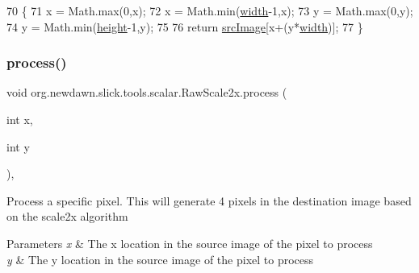 \begin{DoxyCode}
70     \{
71         x = Math.max(0,x);
72         x = Math.min(\mbox{\hyperlink{classorg_1_1newdawn_1_1slick_1_1tools_1_1scalar_1_1_raw_scale2x_ac44a63899fa4a47dacffcf3c3fbc5526}{width}}-1,x);
73         y = Math.max(0,y);
74         y = Math.min(\mbox{\hyperlink{classorg_1_1newdawn_1_1slick_1_1tools_1_1scalar_1_1_raw_scale2x_aadc4e62f40dbfa6633ca33b180aeea88}{height}}-1,y);
75         
76         \textcolor{keywordflow}{return} \mbox{\hyperlink{classorg_1_1newdawn_1_1slick_1_1tools_1_1scalar_1_1_raw_scale2x_a5ceee85c3e6cf53370f34690ef527cb7}{srcImage}}[x+(y*\mbox{\hyperlink{classorg_1_1newdawn_1_1slick_1_1tools_1_1scalar_1_1_raw_scale2x_ac44a63899fa4a47dacffcf3c3fbc5526}{width}})];
77     \}
\end{DoxyCode}
\mbox{\label{classorg_1_1newdawn_1_1slick_1_1tools_1_1scalar_1_1_raw_scale2x_a9b487c958a8d6498f319877102f6a390}} 
\subsubsection{\texorpdfstring{process()}{process()}}
{\footnotesize\ttfamily void org.\+newdawn.\+slick.\+tools.\+scalar.\+Raw\+Scale2x.\+process (\begin{DoxyParamCaption}\item[{int}]{x,  }\item[{int}]{y }\end{DoxyParamCaption})\hspace{0.3cm}{\ttfamily [inline]}, {\ttfamily [private]}}

Process a specific pixel. This will generate 4 pixels in the destination image based on the scale2x algorithm


\begin{DoxyParams}{Parameters}
{\em x} & The x location in the source image of the pixel to process \\
\hline
{\em y} & The y location in the source image of the pixel to process \\
\hline
\end{DoxyParams}

